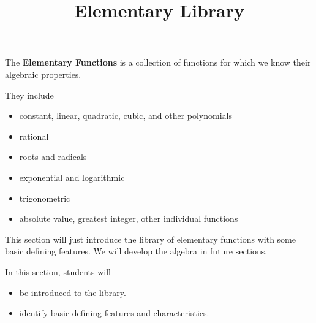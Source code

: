 \documentclass{ximera}
\title{Elementary Library}
\begin{document}
\begin{abstract}
\end{abstract}
\maketitle




The \textbf{Elementary Functions} is a collection of functions for which we know their algebraic properties.

They include 

\begin{itemize}
\item constant, linear, quadratic, cubic, and other polynomials
\item rational
\item roots and radicals
\item exponential and logarithmic
\item trigonometric
\item absolute value, greatest integer, other individual functions
\end{itemize}



This section will just introduce the library of elementary functions with some basic defining features.  We will develop the algebra in future sections.














\begin{sectionOutcomes}
In this section, students will 

\begin{itemize}
\item be introduced to the library.
\item identify basic defining features and characteristics.
\end{itemize}
\end{sectionOutcomes}
\end{document}
